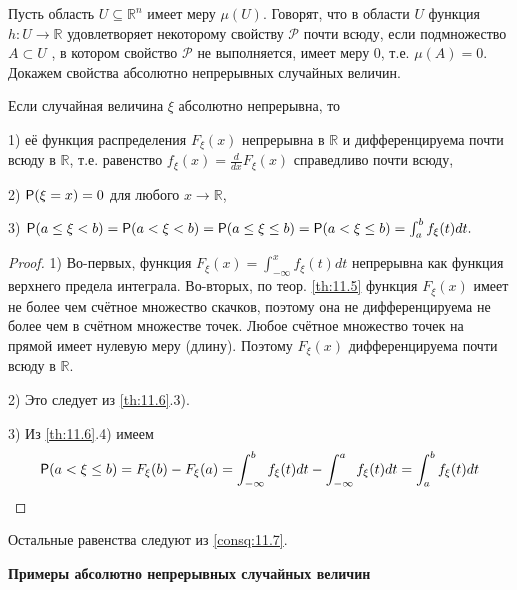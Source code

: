 \begin{definition}
 \label{def:12.4}

Пусть область $U \subseteq \mathbb{R}^n$ имеет меру $\mu(U )$. Говорят, что в области $U$ функция $h : U \to \mathbb{R}$ удовлетворяет некоторому свойству $\mathcal{P}$ почти всюду, если подмножество $A \subset U$ , в котором свойство $\mathcal{P}$ не выполняется, имеет меру 0, т.е. $\mu(A) = 0$.
Докажем свойства абсолютно непрерывных случайных величин.
\end{definition}

\begin{theorem}
 \label{th:12.5}

Если случайная величина $\xi$ абсолютно непрерывна, то

1) её функция распределения $F_{\xi}(x)$ непрерывна в $\mathbb{R}$ и дифференцируема почти всюду в $\mathbb{R}$, т.е. равенство $f_{\xi}(x) = \frac{d}{dx}F_{\xi}(x)$ справедливо почти всюду,

2) $\P(\xi = x) = 0$ для любого $x \to \mathbb{R}$,

3) $\P(a \leq \xi < b) = \P(a < \xi < b) = \P(a \leq \xi \leq b) = \P(a < \xi \leq b) = \int_{a}^{b}f_{\xi}(t)dt.$
\end{theorem}

\begin{proof}
1) Во-первых, функция $F_{\xi}(x) = \int_{-\infty}^{x}f_{\xi}(t)dt$ непрерывна как функция верхнего предела интеграла.
Во-вторых, по теор. \ref{th:11.5} функция $F_{\xi}(x)$ имеет не более чем счётное множество скачков, поэтому она не дифференцируема не более чем в счётном
множестве точек. Любое счётное множество точек на прямой имеет нулевую меру (длину). Поэтому $F_{\xi}(x)$ дифференцируема почти всюду в $\mathbb{R}$.

2) Это следует из \ref{th:11.6}.3).

3) Из \ref{th:11.6}.4) имеем
$$\P(a < \xi \leq b) = F_{\xi}(b) - F_{\xi}(a) = \int_{-\infty}^{b}f_{\xi}(t)dt - \int_{-\infty}^{a}f_{\xi}(t)dt = \int_{a}^{b}f_{\xi}(t)dt$$

\end{proof}
Остальные равенства следуют из \ref{consq:11.7}.

\vspace{1em}\textbf{Примеры абсолютно непрерывных случайных величин}

